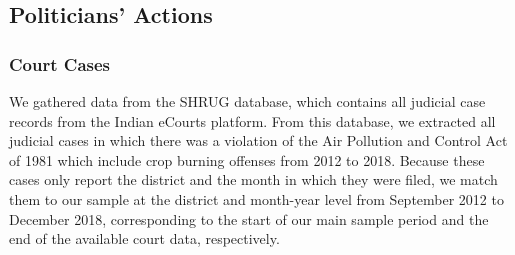 \documentclass[12pt]{article}
\begin{document}
{





\subsection{Politicians' Actions}
\subsubsection{Court Cases\label{ssec:courts}} We gathered data from the SHRUG \citep{shrug_judicial} database, which contains all judicial case records from the Indian eCourts platform. From this database, we extracted all judicial cases in which there was a violation of the Air Pollution and Control Act of 1981 which include crop burning offenses from 2012 to 2018. 
%
Because these cases only report the district and the month in which they were filed, we match them to our sample at the district and month-year level from September 2012 to December 2018, corresponding to the start of our main sample period and the end of the available court data, respectively.



}
\end{document}
